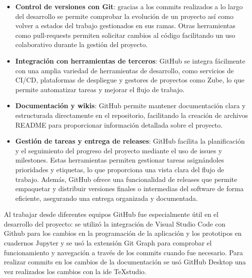 	\begin{itemize}
		
		\item \textbf{Control de versiones con Git}: gracias a los commits realizados a lo largo del desarrollo se permite comprobar la evolución de un proyecto así como volver a estados del trabajo gestionados en sus ramas. Otras herramientas como pull-requests permiten solicitar cambios al código facilitando un uso colaborativo durante la gestión del proyecto.
		
		\item \textbf{Integración con herramientas de terceros}: GitHub se integra fácilmente con una amplia variedad de herramientas de desarrollo, como servicios de CI/CD, plataformas de despliegue y gestores de proyectos como Zube, lo que permite automatizar tareas y mejorar el flujo de trabajo.
		
		\item \textbf{Documentación y wikis}: GitHub permite mantener documentación clara y estructurada directamente en el repositorio, facilitando la creación de archivos README para proporcionar información detallada sobre el proyecto.
		
		\item \textbf{Gestión de tareas y entrega de releases}: GitHub facilita la planificación y el seguimiento del progreso del proyecto mediante el uso de issues y milestones. Estas herramientas permiten gestionar tareas asignándoles prioridades y etiquetas, lo que proporciona una vista clara del flujo de trabajo. Además, GitHub ofrece una funcionalidad de releases que permite empaquetar y distribuir versiones finales o intermedias del software de forma eficiente, asegurando una entrega organizada y documentada.
		
		
	\end{itemize}
	Al trabajar desde diferentes equipos GitHub fue especialmente útil en el desarrollo del proyecto: se utilizó la integración de Visual Studio Code con Github para los cambios en la programación de la aplicación y los prototipos en cuadernos Jupyter y se usó la extensión Git Graph para comprobar el funcionamiento y navegación a través de los commits cuando fue necesario. Para realizar commits en los cambios de la documentación se usó GitHub Desktop una vez realizados los cambios con la \acrshort{ide} TeXstudio.
	
